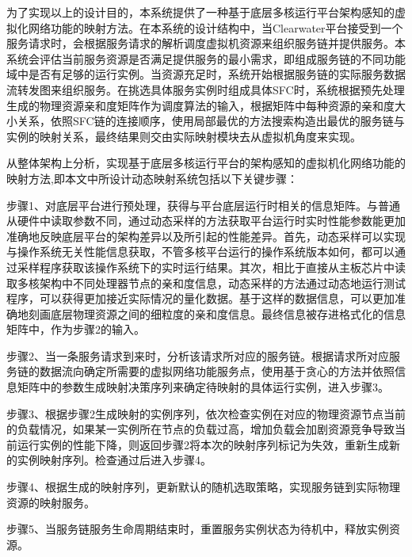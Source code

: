 为了实现以上的设计目的，本系统提供了一种基于底层多核运行平台架构感知的虚拟化网络功能的映射方法。在本系统的设计结构中，当Clearwater平台接受到一个服务请求时，会根据服务请求的解析调度虚拟机资源来组织服务链并提供服务。本系统会评估当前服务资源是否满足提供服务的最小需求，即组成服务链的不同功能域中是否有足够的运行实例。当资源充足时，系统开始根据服务链的实际服务数据流转发图来组织服务。在挑选具体服务实例时组成具体SFC时，系统根据预先处理生成的物理资源亲和度矩阵作为调度算法的输入，根据矩阵中每种资源的亲和度大小关系，依照SFC链的连接顺序，使用局部最优的方法搜索构造出最优的服务链与实例的映射关系，最终结果则交由实际映射模块去从虚拟机角度来实现。

从整体架构上分析，实现基于底层多核运行平台的架构感知的虚拟机化网络功能的映射方法,即本文中所设计动态映射系统包括以下关键步骤：

步骤1、对底层平台进行预处理，获得与平台底层运行时相关的信息矩阵。与普通从硬件中读取参数不同，通过动态采样的方法获取平台运行时实时性能参数能更加准确地反映底层平台的架构差异以及所引起的性能差异。首先，动态采样可以实现与操作系统无关性能信息获取，不管多核平台运行的操作系统版本如何，都可以通过采样程序获取该操作系统下的实时运行结果。其次，相比于直接从主板芯片中读取多核架构中不同处理器节点的亲和度信息，动态采样的方法通过动态地运行测试程序，可以获得更加接近实际情况的量化数据。基于这样的数据信息，可以更加准确地刻画底层物理资源之间的细粒度的亲和度信息。最终信息被存进格式化的信息矩阵中，作为步骤2的输入。 

步骤2、当一条服务请求到来时，分析该请求所对应的服务链。根据请求所对应服务链的数据流向确定所需要的虚拟网络功能服务点，使用基于贪心的方法并依照信息矩阵中的参数生成映射决策序列来确定待映射的具体运行实例，进入步骤3。

步骤3、根据步骤2生成映射的实例序列，依次检查实例在对应的物理资源节点当前的负载情况，如果某一实例所在节点的负载过高，增加负载会加剧资源竞争导致当前运行实例的性能下降，则返回步骤2将本次的映射序列标记为失效，重新生成新的实例映射序列。检查通过后进入步骤4。

步骤4、根据生成的映射序列，更新默认的随机选取策略，实现服务链到实际物理资源的映射服务。

步骤5、当服务链服务生命周期结束时，重置服务实例状态为待机中，释放实例资源。

